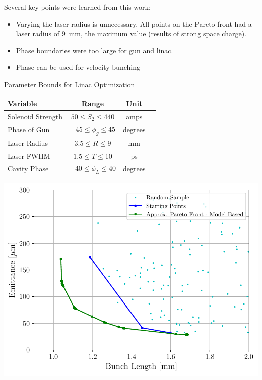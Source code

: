 \documentclass[portrait,final,paperwidth=92cm, paperheight=152cm,  fontscale=0.277]{baposter}
\begin{document}
\begin{poster}
{\begin{center}
\begin{minipage}{0.5\textwidth}
Several key points were learned from this work:
\begin{itemize}
	\itemsep0em
	\item Varying the laser radius is unnecessary. 
	All points on the Pareto front	had a laser radius of \SI{9}{mm}, the maximum value (results of strong space charge).
	\item Phase boundaries were too large for gun and linac.
	\item Phase can be used for velocity bunching	
\end{itemize}
		
\vspace{3em}
		\begin{singlespace}
			\centering
			
			Parameter Bounds for Linac Optimization
			
			\begin{tabular}{ l *{3}{c}}
				\hline%
				\textbf{Variable} & \textbf{Range} & \textbf{Unit} \\
				\hline%
				Solenoid Strength & $ 50 \le S_2 \le 440$  & amps \\
				Phase of Gun & $-45 \le \phi_g \le 45$  & degrees \\
				Laser Radius  & $3.5 \le R \le 9$  & mm \\
				Laser FWHM & $1.5 \le T \le $10  & ps \\
				Cavity Phase & $-40 \le \phi_L \le 40$  & degrees \\
				\hline%
			\end{tabular}
		\end{singlespace}
	\end{minipage}\hspace{1em}
	\begin{minipage}{0.48\textwidth}
		\centering
		\includegraphics[width=1\textwidth]{THPMF049f2}
		

\end{minipage}
\end{center}}
\end{poster}
\end{document}
